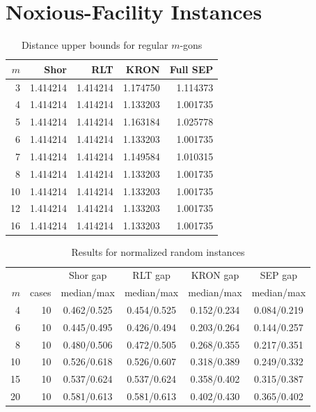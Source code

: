\documentclass[11pt]{article}
\begin{document}
\section{Noxious-Facility Instances}
\begin{table}
\caption{Distance upper bounds for regular \(m\)-gons}
\vskip 10pt
\label{tab:regular}
\centering
\begin{tabular}{r|rrrr}
\toprule
\(m\) & Shor & RLT & KRON & Full SEP \\
\midrule
3  & 1.414214 & 1.414214 & 1.174750 & 1.114373 \\
4  & 1.414214 & 1.414214 & 1.133203 & 1.001735 \\
5  & 1.414214 & 1.414214 & 1.163184 & 1.025778 \\
6  & 1.414214 & 1.414214 & 1.133203 & 1.001735 \\
7  & 1.414214 & 1.414214 & 1.149584 & 1.010315 \\
8  & 1.414214 & 1.414214 & 1.133203 & 1.001735 \\
10 & 1.414214 & 1.414214 & 1.133203 & 1.001735 \\
12 & 1.414214 & 1.414214 & 1.133203 & 1.001735 \\
16 & 1.414214 & 1.414214 & 1.133203 & 1.001735 \\
\bottomrule
\end{tabular}
\end{table}

\begin{table}
\caption{Results for normalized random instances}
\label{tab:random}
\vskip 10pt
\centering
\begin{tabular}{rr|c|c|c|c}
\toprule
 & &Shor gap &  RLT gap & KRON gap & SEP gap\\
\(m\) & cases & median/max & median/max & median/max& median/max\\
\midrule
4  & 10 & 0.462/0.525 & 0.454/0.525 & 0.152/0.234 & 0.084/0.219 \\
6  & 10 & 0.445/0.495 & 0.426/0.494 & 0.203/0.264 & 0.144/0.257 \\
8  & 10 & 0.480/0.506 & 0.472/0.505 & 0.268/0.355 & 0.217/0.351 \\
10 & 10 & 0.526/0.618 & 0.526/0.607 & 0.318/0.389 & 0.249/0.332 \\
15 & 10 & 0.537/0.624 & 0.537/0.624 & 0.358/0.402 & 0.315/0.387 \\
20 & 10 & 0.581/0.613 & 0.581/0.613 & 0.402/0.430 & 0.365/0.402 \\
\bottomrule
\end{tabular}
\end{table}
\end{document}
